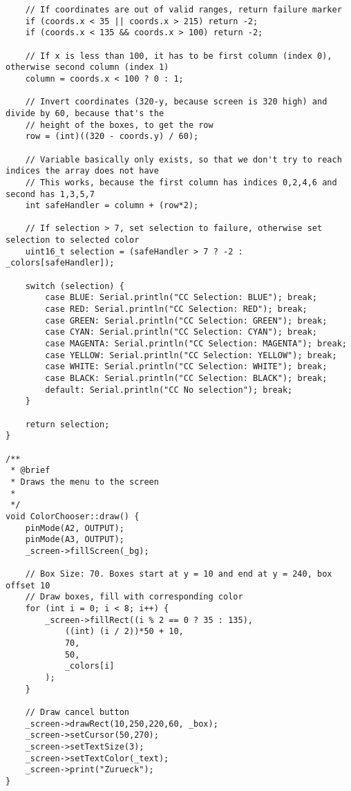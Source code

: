 \documentclass[a4paper, 11pt]{scrartcl}
\begin{document}
\begin{lstlisting}
    // If coordinates are out of valid ranges, return failure marker
    if (coords.x < 35 || coords.x > 215) return -2;
    if (coords.x < 135 && coords.x > 100) return -2;

    // If x is less than 100, it has to be first column (index 0), otherwise second column (index 1)
    column = coords.x < 100 ? 0 : 1;

    // Invert coordinates (320-y, because screen is 320 high) and divide by 60, because that's the 
    // height of the boxes, to get the row
    row = (int)((320 - coords.y) / 60);

    // Variable basically only exists, so that we don't try to reach indices the array does not have
    // This works, because the first column has indices 0,2,4,6 and second has 1,3,5,7
    int safeHandler = column + (row*2);

    // If selection > 7, set selection to failure, otherwise set selection to selected color
    uint16_t selection = (safeHandler > 7 ? -2 : _colors[safeHandler]);

    switch (selection) {
        case BLUE: Serial.println("CC Selection: BLUE"); break;
        case RED: Serial.println("CC Selection: RED"); break;
        case GREEN: Serial.println("CC Selection: GREEN"); break;
        case CYAN: Serial.println("CC Selection: CYAN"); break;
        case MAGENTA: Serial.println("CC Selection: MAGENTA"); break;
        case YELLOW: Serial.println("CC Selection: YELLOW"); break;
        case WHITE: Serial.println("CC Selection: WHITE"); break;
        case BLACK: Serial.println("CC Selection: BLACK"); break;
        default: Serial.println("CC No selection"); break;
    }

    return selection;
}

/**
 * @brief 
 * Draws the menu to the screen
 * 
 */
void ColorChooser::draw() {
    pinMode(A2, OUTPUT);
    pinMode(A3, OUTPUT);
    _screen->fillScreen(_bg);

    // Box Size: 70. Boxes start at y = 10 and end at y = 240, box offset 10
    // Draw boxes, fill with corresponding color
    for (int i = 0; i < 8; i++) {
        _screen->fillRect((i % 2 == 0 ? 35 : 135),
            ((int) (i / 2))*50 + 10,
            70,
            50,
            _colors[i]
        );
    }

    // Draw cancel button
    _screen->drawRect(10,250,220,60, _box);
    _screen->setCursor(50,270);
    _screen->setTextSize(3);
    _screen->setTextColor(_text);
    _screen->print("Zurueck");
}
\end{lstlisting}
\end{document}
